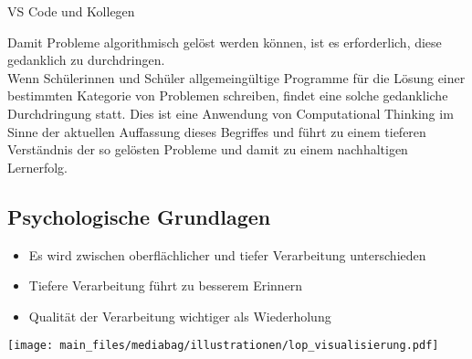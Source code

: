 \documentclass[
  letterpaper,
  DIV=11,
  numbers=noendperiod]{scrartcl}
\providecommand{\tightlist}{%
  \setlength{\itemsep}{0pt}\setlength{\parskip}{0pt}}\usepackage{longtable,booktabs,array}
\begin{document}
\begin{tcolorbox}[enhanced jigsaw, opacityback=0, arc=.35mm, coltitle=black, opacitybacktitle=0.6, title={Reale Werkzeuge}, bottomrule=.15mm, colbacktitle=quarto-callout-tip-color!10!white, toprule=.15mm, bottomtitle=1mm, breakable, toptitle=1mm, left=2mm, rightrule=.15mm, leftrule=.75mm, colframe=quarto-callout-tip-color-frame, titlerule=0mm, colback=white]

VS Code und Kollegen

\end{tcolorbox}

Damit Probleme algorithmisch gelöst werden können, ist es erforderlich,
diese gedanklich zu durchdringen.\\
Wenn Schülerinnen und Schüler allgemeingültige Programme für die Lösung
einer bestimmten Kategorie von Problemen schreiben, findet eine solche
gedankliche Durchdringung statt. Dies ist eine Anwendung von
Computational Thinking im Sinne der aktuellen Auffassung dieses
Begriffes und führt zu einem tieferen Verständnis der so gelösten
Probleme und damit zu einem nachhaltigen Lernerfolg.

\subsection{Psychologische Grundlagen}\label{psychologische-grundlagen}

\begin{tcolorbox}[enhanced jigsaw, opacityback=0, arc=.35mm, coltitle=black, opacitybacktitle=0.6, title={Levels of Processing Theory}, bottomrule=.15mm, colbacktitle=quarto-callout-note-color!10!white, toprule=.15mm, bottomtitle=1mm, breakable, toptitle=1mm, left=2mm, rightrule=.15mm, leftrule=.75mm, colframe=quarto-callout-note-color-frame, titlerule=0mm, colback=white]

\begin{itemize}
\tightlist
\item
  Es wird zwischen oberflächlicher und tiefer Verarbeitung unterschieden
\item
  Tiefere Verarbeitung führt zu besserem Erinnern
\item
  Qualität der Verarbeitung wichtiger als Wiederholung
\end{itemize}

\end{tcolorbox}

\texttt{[image: main\_files/mediabag/illustrationen/lop\_visualisierung.pdf]}
\end{document}
